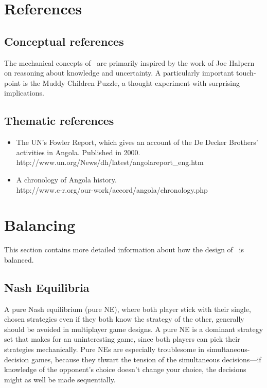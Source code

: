 \section{References}

\subsection{Conceptual references}
The mechanical concepts of \gtitle\ are primarily inspired by the work of Joe Halpern on reasoning about knowledge and uncertainty.  A particularly important touch-point is the Muddy Children Puzzle, a thought experiment with surprising implications.


\subsection{Thematic references}
\begin{itemize}
\item The UN's Fowler Report, which gives an account of the De Decker Brothers' activities in Angola.  Published in 2000.\\
http://www.un.org/News/dh/latest/angolareport\_eng.htm

\item A chronology of Angola history.\\
http://www.c-r.org/our-work/accord/angola/chronology.php
\end{itemize}


\newpage

\section{Balancing}
This section contains more detailed information about how the design of \gtitle\ is balanced.

\subsection{Nash Equilibria}
A pure Nash equilibrium (pure NE), where both player stick with their single, chosen strategies even if they both know the strategy of the other, generally should be avoided in multiplayer game designs.  A pure NE is a dominant strategy set that makes for an uninteresting game, since both players can pick their strategies mechanically.  Pure NEs are especially troublesome in simultaneous-decision games, because they thwart the tension of the simultaneous decisions---if knowledge of the opponent's choice doesn't change your choice, the decisions might as well be made sequentially.

